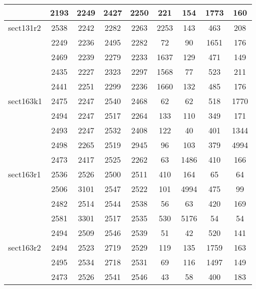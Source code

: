 \documentclass[a4paper, 8pt, envcountsect, runningheads]{article}
\begin{document}
\begin{center}
\begin{longtable}{ |l|c|c|c|c|c|c|c|c| }
	 & 2193 & 2249 & 2427 & 2250 & 221 & 154 & 1773 & 160 \\ \hline
	 
	 sect131r2 & 2538 & 2242 & 2282 & 2263 & 2253 & 143 & 463 & 208 \\
	 
	 & 2249 & 2236 & 2495 & 2282 & 72 & 90 & 1651 & 176 \\
	 	 
	 & 2469 & 2239 & 2279 & 2233 & 1637 & 129 & 471 & 149 \\
	 
	 & 2435 & 2227 & 2323 & 2297 & 1568 & 77 & 523 & 211 \\
	 
	 & 2441 & 2251 & 2299 & 2236 & 1660 & 132 & 485 & 176 \\ \hline	 
	 
	 sect163k1 & 2475 & 2247 & 2540 & 2468 & 62 & 62 & 518 & 1770 \\
	 
	 & 2494 & 2247 & 2517 & 2264 & 133 & 110 & 349 & 171 \\
	 	 
	 & 2493 & 2247 & 2532 & 2408 & 122 & 40 & 401 & 1344 \\
	 
	 & 2498 & 2265 & 2519 & 2945 & 96 & 103 & 379 & 4994 \\
	 
	 & 2473 & 2417 & 2525 & 2262 & 63 & 1486 & 410 & 166 \\ \hline	 
	 
	 sect163r1 & 2536 & 2526 & 2500 & 2511 & 410 & 164 & 65 & 64 \\
	 
	 & 2506 & 3101 & 2547 & 2522 & 101 & 4994 & 475 & 99 \\
	 	 
	 & 2482 & 2514 & 2544 & 2538 & 56 & 63 & 420 & 169 \\
	 
	 & 2581 & 3301 & 2517 & 2535 & 530 & 5176 & 54 & 54 \\
	 
	 & 2494 & 2509 & 2546 & 2539 & 51 & 42 & 520 & 141 \\ \hline	
	  
	 sect163r2 & 2494 & 2523 & 2719 & 2529 & 119 & 135 & 1759 & 163 \\
	 
	 & 2495 & 2534 & 2718 & 2531 & 69 & 116 & 1497 & 149 \\
	 	 
	 & 2473 & 2526 & 2541 & 2546 & 43 & 58 & 400 & 183 \\
	 

\end{longtable}
\end{center}
\end{document}
